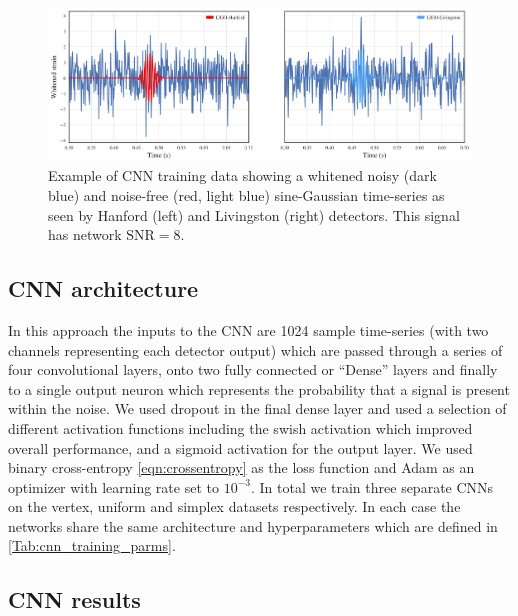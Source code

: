 \documentclass[12pt]{iopart}
\begin{document}
\begin{figure}[ht!]
    \centering
    \includegraphics[width=\textwidth]{figures/SNR8.png}
    \caption{Example of \ac{CNN} training data showing a whitened noisy (dark blue) and noise-free (red, light blue) sine-Gaussian time-series as seen by Hanford (left) and Livingston (right) detectors. This signal has network $\text{SNR}=8$.}
     \label{fig:cnn_training}
\end{figure}

\subsection{CNN architecture}
In this approach the inputs to the \ac{CNN} are 1024 sample time-series (with two channels representing each detector output) which are passed through a series of four convolutional layers, onto two fully connected or ``Dense'' layers and finally to a single output neuron which represents the probability that a signal is present within the noise. We used dropout in the final dense layer and used a selection of different activation functions including the swish activation \cite{ramachandran2017searching} which improved overall performance, and a sigmoid activation for the output layer. We used binary cross-entropy \cref{eqn:crossentropy} as the loss function and Adam \cite{DBLP:journals/corr/KingmaB14} as an optimizer with learning rate set to $10^{-3}$. In total we train three separate \acp{CNN} on the vertex, uniform and simplex datasets respectively. In each case the networks share the same architecture and hyperparameters which are defined in \cref{Tab:cnn_training_parms}.

\subsection{CNN results}
\end{document}
